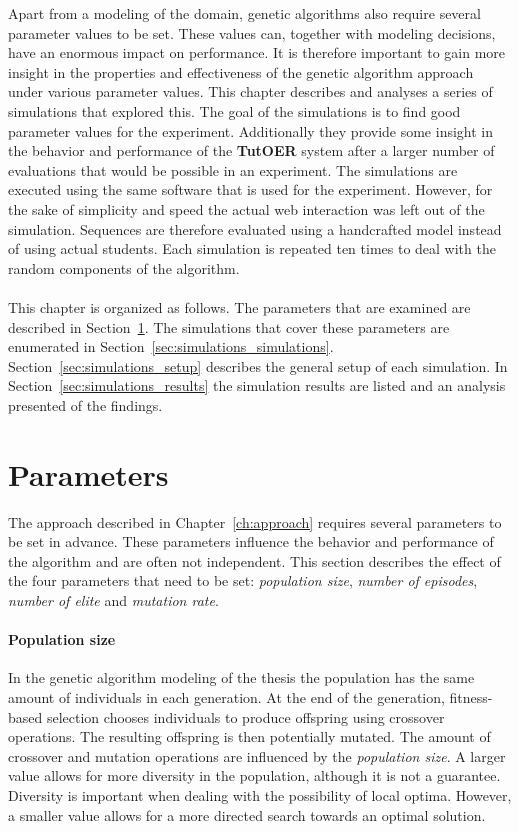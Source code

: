 Apart from a modeling of the domain, genetic algorithms also require several
parameter values to be set. These values can, together with modeling decisions,
have an enormous impact on performance. It is therefore important to gain more
insight in the properties and effectiveness of the genetic algorithm approach
under various parameter values. This chapter describes and analyses a series of
simulations that explored this. The goal of the simulations is to find good
parameter values for the experiment. Additionally they provide some insight in
the behavior and performance of the \textbf{TutOER} system after a larger number
of evaluations that would be possible in an experiment. The simulations are
executed using the same software that is used for the experiment. However, for
the sake of simplicity and speed the actual web interaction was left out of the
simulation. Sequences are therefore evaluated using a handcrafted model instead
of using actual students. Each simulation is repeated ten times to deal with
the random components of the algorithm.\\\\
\noindent
This chapter is organized as follows. The parameters that are examined are
described in Section~\ref{sec:simulations_parameters}.  The simulations that
cover these parameters are enumerated in
Section~\ref{sec:simulations_simulations}. Section~\ref{sec:simulations_setup}
describes the general setup of each simulation. In
Section~\ref{sec:simulations_results} the simulation results are listed and an
analysis presented of the findings.

\section{Parameters}
\label{sec:simulations_parameters}
The approach described in Chapter~\ref{ch:approach} requires several parameters
to be set in advance. These parameters influence the behavior and performance
of the algorithm and are often not independent. This section describes the
effect of the four parameters that need to be set: \emph{population size},
\emph{number of episodes}, \emph{number of elite} and \emph{mutation rate}.
\paragraph{Population size} In the genetic algorithm modeling of the thesis
the population has the same amount of individuals in each generation. At the
end of the generation, fitness-based selection chooses individuals to produce
offspring using crossover operations. The resulting offspring is then
potentially mutated. The amount of crossover and mutation operations are
influenced by the \emph{population size}. A larger value allows for more
diversity in the population, although it is not a guarantee. Diversity is
important when dealing with the possibility of local optima. However, a smaller
value allows for a more directed search towards an optimal solution.
